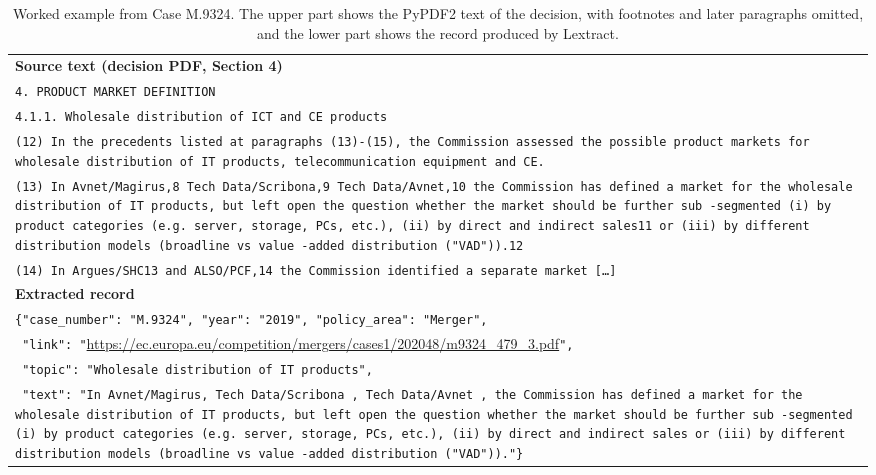 \documentclass{IOS-Book-Article}
\begin{document}
\begin{table}[t]
\caption{Worked example from Case M.9324. The upper part shows the PyPDF2 text
of the decision, with footnotes and later paragraphs omitted, and the lower part
shows the record produced by Lextract.}
\label{tab:example}
\small
\begin{tabular}{p{}}
\toprule
\textbf{Source text (decision PDF, Section 4)}\\
\texttt{4. PRODUCT MARKET DEFINITION}\\
\texttt{4.1.1. Wholesale distribution of ICT and CE products}\\
\texttt{(12) In the precedents listed at paragraphs (13)-(15), the Commission assessed the possible product markets for wholesale distribution of IT products, telecommunication equipment and CE.}\\
\texttt{(13) In Avnet/Magirus,8 Tech Data/Scribona,9 Tech Data/Avnet,10 the Commission has defined a market for the wholesale distribution of IT products, but left open the question whether the market should be further sub -segmented (i) by product categories (e.g. server, storage, PCs, etc.), (ii) by direct and indirect sales11 or (iii) by different distribution models (broadline vs value -added distribution ("VAD")).12}\\
\texttt{(14) In Argues/SHC13 and ALSO/PCF,14 the Commission identified a separate market [\ldots]}\\
\midrule
\textbf{Extracted record}\\
\texttt{\{"case\_number": "M.9324", "year": "2019", "policy\_area": "Merger",}\\
\texttt{\ "link": "}\url{https://ec.europa.eu/competition/mergers/cases1/202048/m9324_479_3.pdf}\texttt{",}\\
\texttt{\ "topic": "Wholesale distribution of IT products",}\\
\texttt{\ "text": "In Avnet/Magirus, Tech Data/Scribona , Tech Data/Avnet , the Commission has defined a market for the wholesale distribution of IT products, but left open the question whether the market should be further sub -segmented (i) by product categories (e.g. server, storage, PCs, etc.), (ii) by direct and indirect sales or (iii) by different distribution models (broadline vs value -added distribution ("VAD"))."\}}\\
\bottomrule
\end{tabular}
\end{table}
\end{document}
